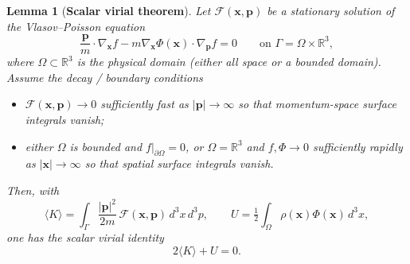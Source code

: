 \documentclass[12pt,a4paper]{article}
\newtheorem{lem}[thm]{Lemma}
\numberwithin{equation}{section}
\begin{document}
\begin{lem}[\textbf{Scalar virial theorem}]
Let $\mathcal{F}(\mathbf{x},\mathbf{p})$ be a stationary solution of the Vlasov--Poisson equation
\begin{equation}
\frac{\mathbf{p}}{m}\!\cdot\!\nabla_{\mathbf{x}} f - m\nabla_{\mathbf{x}}\Phi(\mathbf{x})\!\cdot\!\nabla_{\mathbf{p}} f = 0
\qquad\text{on }\Gamma=\Omega\times\mathbb{R}^3,
\end{equation}
where $\Omega\subset\mathbb{R}^3$ is the physical domain (either all space or a bounded domain). Assume the decay / boundary conditions
\begin{itemize}
  \item $\mathcal{F}(\mathbf{x},\mathbf{p})\to 0$ sufficiently fast as $|\mathbf{p}|\to\infty$ so that momentum-space surface integrals vanish;
  \item either $\Omega$ is bounded and $f|_{\partial\Omega}=0$, or $\Omega=\mathbb{R}^3$ and $f,\Phi\to 0$ sufficiently rapidly as $|\mathbf{x}|\to\infty$ so that spatial surface integrals vanish.
\end{itemize}
Then, with
\begin{equation}
\langle {K}\rangle = \int_{\Gamma}\frac{|\mathbf{p}|^2}{2m}\,\mathcal{F}(\mathbf{x},\mathbf{p})\,d^3x\,d^3p,
\qquad
U = \tfrac12\int_{\Omega}\rho(\mathbf{x})\Phi(\mathbf{x})\,d^3x,
\end{equation}
one has the scalar virial identity
\begin{equation}
2\langle {K}\rangle + U = 0.
\end{equation}
\end{lem}
\end{document}
